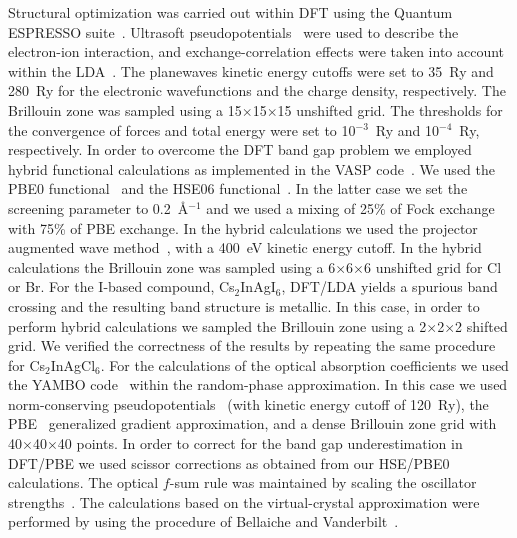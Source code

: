 \documentclass[journal=jpcl,manuscript=letter,layout=traditional]{achemso}
\begin{document}
\vspace{0.5 cm}
Structural optimization was carried out within DFT using the Quantum ESPRESSO suite~\cite{QE-2009}.
Ultrasoft pseudopotentials~\cite{Rappe,Vanderbilt} were used to describe the electron-ion interaction,
and exchange-correlation effects were taken into account within the LDA~\cite{Ceperley,Perdew}.
The planewaves kinetic energy cutoffs were set to 35~Ry and 280~Ry for the electronic wavefunctions
and the charge density, respectively. The Brillouin zone was sampled using a 15$\times$15$\times$15
unshifted grid. The thresholds for the convergence of forces and total energy were set to 10$^{-3}$~Ry
and 10$^{-4}$~Ry, respectively. In order to overcome the DFT band gap problem we employed hybrid functional
calculations as implemented in the VASP code~\cite{vasp}. We used the PBE0 functional~\cite{pbe0}
and the HSE06 functional~\cite{HSE06}. In the latter case we set the screening parameter to 0.2~\AA$^{-1}$
and we used a mixing of 25\% of Fock exchange with 75\% of PBE exchange. In the hybrid calculations
we used the projector augmented wave method~\cite{paw}, with a 400~eV kinetic energy cutoff.
In the hybrid calculations the Brillouin zone was sampled using a 6$\times$6$\times$6 unshifted grid
for Cl or Br. For the I-based compound, Cs$_2$InAgI$_6$, DFT/LDA yields a spurious band crossing
and the resulting band structure is metallic. In this case, in order to perform hybrid calculations
we sampled the Brillouin zone using a 2$\times$2$\times$2 shifted grid.
We verified the correctness of the results by repeating the
same procedure for Cs$_2$InAgCl$_6$. For the calculations of the optical absorption coefficients
we used the YAMBO code~\cite{Yambo} within the random-phase approximation. In this case we used
norm-conserving pseudopotentials~\cite{TM} (with kinetic energy cutoff of 120~Ry), the PBE~\cite{pbe}
generalized gradient approximation, and a dense Brillouin zone grid with 40$\times$40$\times$40 points.
In order to correct for the band gap underestimation in DFT/PBE we used scissor corrections as
obtained from our HSE/PBE0 calculations. The optical $f$-sum rule was maintained by scaling the
oscillator strengths~\cite{Zacharias2015}.
The calculations based on the virtual-crystal approximation were performed by using
the procedure of Bellaiche and Vanderbilt~\cite{VCA}.
\end{document}
